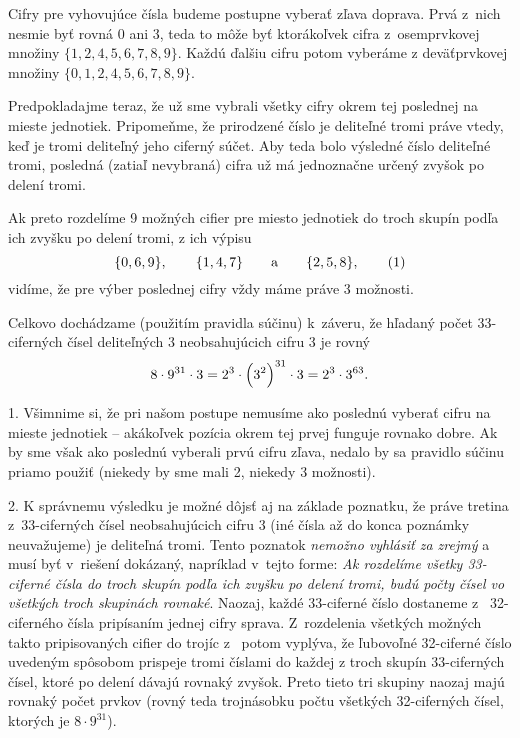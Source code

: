 {%
Cifry pre vyhovujúce čísla budeme postupne vyberať zľava doprava.
Prvá z~nich nesmie byť rovná $0$ ani $3$, teda to môže byť
ktorákoľvek cifra z~osemprvkovej množiny $\{1, 2, 4, 5, 6, 7, 8, 9\}$.
Každú ďalšiu cifru potom vyberáme z deväťprvkovej
množiny $\{0, 1, 2, 4, 5, 6, 7, 8, 9\}$.

Predpokladajme teraz, že už sme vybrali všetky cifry
okrem tej poslednej na mieste jednotiek. Pripomeňme, že
prirodzené číslo je deliteľné tromi práve vtedy, keď je tromi deliteľný
jeho ciferný súčet. Aby teda bolo výsledné číslo deliteľné tromi,
posledná (zatiaľ nevybraná) cifra už má jednoznačne
určený zvyšok po delení tromi.

Ak preto rozdelíme 9 možných cifier pre miesto jednotiek
do troch skupín podľa ich zvyšku po delení tromi, z ich
výpisu
$$
\{0, 6, 9\},\qquad\{1, 4, 7\}\qquad\hbox{a}\qquad\{2, 5, 8\},
\tag1
$$
vidíme, že pre výber poslednej cifry vždy
máme práve 3 možnosti.

Celkovo dochádzame (použitím pravidla súčinu) k~záveru,
že hľadaný počet 33-ciferných čísel deliteľných 3
neobsahujúcich cifru 3 je rovný
$$
8\cdot9^{31}\cdot3=2^3\cdot\Bigl(3^2\Bigr)^{31}\cdot3
=2^3\cdot3^{63}.
$$

\poznamky
\item{1.} Všimnime si, že pri našom postupe nemusíme ako poslednú
vyberať cifru na mieste jednotiek -- akákoľvek pozícia okrem tej
prvej funguje rovnako dobre. Ak by sme však ako poslednú
vyberali prvú cifru zľava, nedalo by sa pravidlo súčinu priamo
použiť (niekedy by sme mali 2, niekedy 3 možnosti).

\item{2.} K správnemu výsledku je možné dôjsť aj na základe poznatku,
že práve tretina z~33-ciferných čísel neobsahujúcich cifru 3
(iné čísla až do konca poznámky neuvažujeme)
je deliteľná tromi. Tento poznatok {\it nemožno vyhlásiť za zrejmý}
a musí byť v~riešení dokázaný, napríklad v~tejto forme:
{\sl Ak rozdelíme všetky 33-ciferné čísla do troch skupín podľa
ich zvyšku po delení tromi, budú počty
čísel vo všetkých troch skupinách rovnaké}. Naozaj,
každé 33-ciferné číslo dostaneme z ~32-ciferného čísla pripísaním
jednej cifry sprava. Z~rozdelenia všetkých možných takto
pripisovaných cifier do trojíc z~ potom vyplýva, že
ľubovoľné 32-ciferné číslo
uvedeným spôsobom prispeje tromi číslami
do každej z troch skupín 33-ciferných čísel,
ktoré po delení dávajú rovnaký zvyšok. Preto tieto tri
skupiny naozaj majú rovnaký počet prvkov (rovný teda
trojnásobku počtu všetkých 32-ciferných čísel, ktorých je ${8\cdot9^{31}}$).

}
